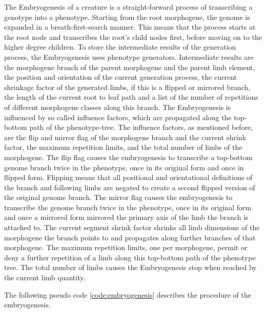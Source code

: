 \documentclass[main]{subfiles}
\begin{document}
The Embryogenesis of a creature is a straight-forward process of transcribing a genotype into a phenotype. %
%
Starting from the root morphogene, the genome is expanded in a breath-first-search manner. %
%
This means that the process starts at the root node and transcribes the root's child nodes first, before moving on to the higher degree children. %
%
To store the intermediate results of the generation process, the Embryogenesis uses phenotype generators. %
%
Intermediate results are the morphogene branch of the parent morphogene and the parent limb element, the position and orientation of the current generation process, the current shrinkage factor of the generated limbs, if this is a flipped or mirrored branch, the length of the current root to leaf path and a list of the number of repetitions of different morphogene classes along this branch. %
%
The Embryogenesis is influenced by so called influence factors, which are propagated along the top-bottom path of the phenotype-tree. %
%
The influence factors, as mentioned before, are the flip and mirror flag of the morphogene branch and the current shrink factor, the maximum repetition limits, and the total number of limbs of the morphogene. %
%
The flip flag causes the embryogenesis to transcribe a top-bottom genome branch twice in the phenotype, once in its original form and once in flipped form. %
%
Flipping means that all positional and orientational definitions of the branch and following limbs are negated to create a second flipped version of the original genome branch. %
%
The mirror flag causes the embryogenesis to transcribe the genome branch twice in the phenotype, once in its original form and once a mirrored form mirrored the primary axis of the limb the branch is attached to. %
%
The current segment shrink factor shrinks all limb dimensions of the morphogene the branch points to and propagates along further branches of that morphogene. %
%
The maximum repetition limits, one per morphogene, permit or deny a further repetition of a limb along this top-bottom path of the phenotype tree. %
%
The total number of limbs causes the Embryogenesis stop when reached by the current limb quantity.

The following pseudo code \ref{code:embryogenesis} describes the procedure of the embryogenesis.
\end{document}
